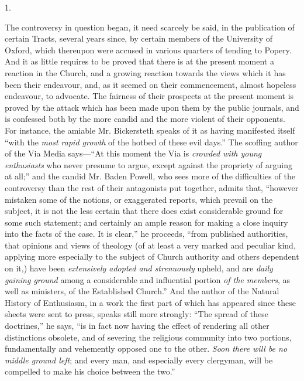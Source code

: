 1.

The controversy in question began, it need
scarcely be said, in the publication of certain Tracts, several years
since, by certain members of the University of Oxford, which thereupon
were accused in various quarters of tending to Popery. And it as
little requires to be proved that there is at the present moment a
reaction in the Church, and a growing reaction towards the views which
it has been their endeavour, and, as it seemed on their
commencement, almost hopeless endeavour, to advocate. The fairness of
their prospects at the present moment is proved by the attack which
has been made upon them by the public journals, and is confessed both
by the more candid and the more violent of their opponents. For
instance, the amiable Mr. Bickersteth speaks of it as having
manifested itself ``with the \emph{most rapid growth} of the hotbed of
these evil days.'' The scoffing author of the Via Media says—``At this
moment the Via is \emph{crowded with young enthusiasts} who never
presume to argue, except against the propriety of arguing at all;'' and
the candid Mr. Baden Powell, who sees more of the difficulties of the
controversy than the rest of their antagonists put together, admits
that, ``however mistaken some of the notions, or exaggerated reports,
which prevail on the subject, it is not the less certain that there
does exist considerable ground for some such statement; and certainly
an ample reason for making a close inquiry into the facts of the case.
It is clear,'' he proceeds, ``from published authorities, that opinions
and views of theology (of at least a very marked and peculiar kind,
applying more especially to the subject of Church authority and others
dependent on it,) have been \emph{extensively adopted and strenuously}
upheld, and are \emph{daily gaining ground} among a considerable and
influential portion \emph{of the members}, as well as ministers, of
the Established Church.'' And the author of the Natural History of
Enthusiasm, in a work the first part of which has appeared since these
sheets were sent to press, speaks still more strongly: ``The spread of
these doctrines,'' he says, ``is in fact now having the effect of
rendering all other distinctions obsolete, and of severing the
religious community into two portions, fundamentally and vehemently
opposed one to the other. \emph{Soon there will be no middle ground left};
and every man, and especially every clergyman, will be compelled
to make his choice between the two.''

